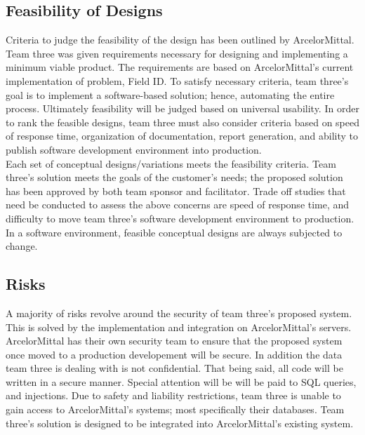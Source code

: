\documentclass[Letter,11pt]{article}
\begin{document}
	\subsection{Feasibility of Designs}
	Criteria to judge the feasibility of the design has been outlined by ArcelorMittal. Team three was given requirements necessary for designing and implementing a minimum viable product. The requirements are based on ArcelorMittal's current implementation of problem, Field ID. To satisfy necessary criteria, team three's goal is to implement a software-based solution; hence, automating the entire process. Ultimately feasibility will be judged based on universal usability. In order to rank the feasible designs, team three must also consider criteria based on speed of response time, organization of documentation, report generation, and ability to publish software development environment into production. \\
	Each set of conceptual designs/variations meets the feasibility criteria. Team three's solution meets the goals of the customer's needs; the proposed solution has been approved by both team sponsor and facilitator. Trade off studies that need be conducted to assess the above concerns are speed of response time, and difficulty to move team three's software development environment to production. In a software environment, feasible conceptual designs are always subjected to change. 
	\subsection{Risks}
	A majority of risks revolve around the security of team three's proposed system. This is solved by the implementation and integration on ArcelorMittal's servers. ArcelorMittal has their own security team to ensure that the proposed system once moved to a production developement will be secure. In addition the data team three is dealing with is not confidential. That being said, all code will be written in a secure manner. Special attention will be will be paid to SQL queries, and injections. Due to safety and liability restrictions, team three is unable to gain access to ArcelorMittal's systems; most specifically their databases. Team three's solution is designed to be integrated into ArcelorMittal's existing system.
\end{document}
